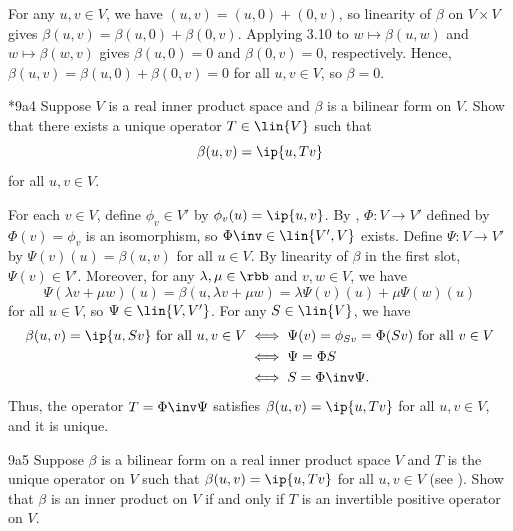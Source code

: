 \begin{sol}
    For any $u, v \in V$, we have $(u, v) = (u, 0) + (0, v)$, so linearity of $\beta$ on $V \times V$ gives $\beta(u, v) = \beta(u, 0) + \beta(0, v)$.
    Applying 3.10 to $w \mapsto \beta(u, w)$ and $w \mapsto \beta(w, v)$ gives $\beta(u, 0) = 0$ and $\beta(0, v) = 0$, respectively.
    Hence, $\beta(u, v) = \beta(u, 0) + \beta(0, v) = 0$ for all $u, v \in V$, so $\beta = 0$.
\end{sol}

\begin{exercise}*{9a4}
    Suppose $V$ is a real inner product space and $\beta$ is a bilinear form on $V$.
    Show that there exists a unique operator $T \in \lin{V}$ such that
    \[
        \beta(u, v) = \ip{u, Tv}
    \]
    for all $u, v \in V$.

\end{exercise}

\begin{sol}
    For each $v \in V$, define $\phi_v \in V'$ by $\phi_v(u) = \ip{u, v}$.
    By , $\Phi \colon V \to V'$ defined by $\Phi(v) = \phi_v$ is an isomorphism, so $\Phi\inv \in \lin{V', V}$ exists.
    Define $\Psi \colon V \to V'$ by $\Psi(v)(u) = \beta(u, v)$ for all $u \in V$.
    By linearity of $\beta$ in the first slot, $\Psi(v) \in V'$.
    Moreover, for any $\lambda, \mu \in \rbb$ and $v, w \in V$, we have
    \[
        \Psi(\lambda v + \mu w)(u) = \beta(u, \lambda v + \mu w) = \lambda \Psi(v)(u) + \mu \Psi(w)(u)
    \]
    for all $u \in V$, so $\Psi \in \lin{V, V'}$.
    For any $S \in \lin{V}$, we have
    \begin{align*}
        \beta(u, v) = \ip{u, S v} \text{ for all $u, v \in V$} &\iff \Psi(v) = \phi_{S v} = \Phi(S v) \text{ for all $v \in V$} \\
        &\iff \Psi = \Phi S \\
        &\iff S = \Phi\inv \Psi.
    \end{align*}
    Thus, the operator $T = \Phi\inv \Psi$ satisfies $\beta(u, v) = \ip{u, Tv}$ for all $u, v \in V$, and it is unique.
\end{sol}

\begin{exercise}{9a5}
    Suppose $\beta$ is a bilinear form on a real inner product space $V$ and $T$ is the unique operator on $V$ such that $\beta(u, v) = \ip{u, Tv}$ for all $u, v \in V$ (see ).
    Show that $\beta$ is an inner product on $V$ if and only if $T$ is an invertible positive operator on $V$.
\end{exercise}


